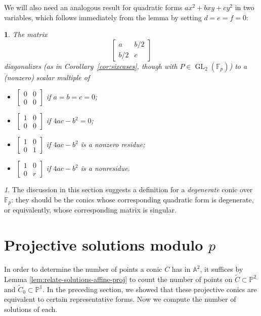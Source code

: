 \documentclass[10pt,a4paper]{amsart}
\numberwithin{equation}{section}
\numberwithin{figure}{section}
\numberwithin{table}{section}
\theoremstyle{definition}
\theoremstyle{plain}
\theoremstyle{remark}
\newtheorem*{rem*}{\protect\remarkname}
\theoremstyle{plain}
\newtheorem{cor}[thm]{\protect\corollaryname}
\theoremstyle{definition}
\theoremstyle{plain}
\theoremstyle{plain}
\providecommand{\remarkname}{Remark}
\providecommand{\corollaryname}{Corollary}
\newcommand{\A}{\mathbb{A}}
\renewcommand{\P}{\mathbb{P}}
\newcommand{\F}{\mathbb{F}}
\newcommand{\GL}{\operatorname{GL}}
\begin{document}
	We will also need an analogous result for quadratic forms $ax^2+bxy+cy^2$ in two variables, which follows immediately from the lemma by setting $d=e=f=0$:
	\begin{cor}\label{cor:diag-P1}
		The matrix
\begin{equation*}
\begin{bmatrix}a&b/2\\b/2&c\end{bmatrix}
\end{equation*}
diagonalizes (as in Corollary~\ref{cor:sixcases}, though with $P \in \GL_2(\F_p)$) to a (nonzero) scalar multiple of
		\begin{itemize}
			\item $\left[\begin{smallmatrix}0&0\\0&0\end{smallmatrix}\right]$ if $a=b=c=0$;
			\item $\left[\begin{smallmatrix}1&0\\0&0\end{smallmatrix}\right]$ if $4ac-b^2=0$;
			\item $\left[\begin{smallmatrix}1&0\\0&1\end{smallmatrix}\right]$ if $4ac-b^2$ is a nonzero residue;
			\item $\left[\begin{smallmatrix}1&0\\0&r\end{smallmatrix}\right]$ if $4ac-b^2$ is a nonresidue.
		\end{itemize}
	\end{cor}
	
	\begin{rem*}
		The discussion in this section suggests a definition for a \emph{degenerate} conic over $\F_p$: they should be the conics whose corresponding quadratic form is degenerate, or equivalently, whose corresponding matrix is singular.
	\end{rem*}
	
	\section{Projective solutions modulo $p$}
	\label{sec:proj-solutions}
	
	In order to determine the number of points a conic $C$ has in $\A^2$, it suffices by Lemma \ref{lem:relate-solutions-affine-proj} to count the number of points on $\widetilde{C}\subset \P^2$ and $\widetilde{C}_0\subset \P^1$. In the preceding section, we showed that these projective conics are equivalent to certain representative forms. Now we compute the number of solutions of each.
	
\end{document}
